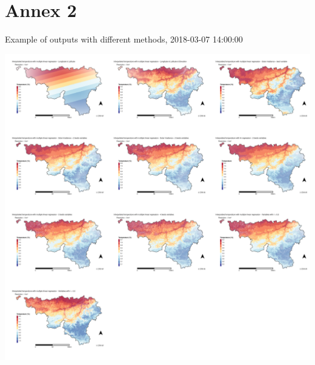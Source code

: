 \documentclass[12pt,twoside]{reedthesis}
\theoremstyle{definition}
\theoremstyle{definition}
\theoremstyle{definition}
\theoremstyle{remark}
\begin{document}
\chapter{Annex 2}\label{annex-2}

Example of outputs with different methods, 2018-03-07 14:00:00
\begin{center}\includegraphics[width=1\linewidth]{figure/2018-03-07_14} \end{center}
\end{document}
